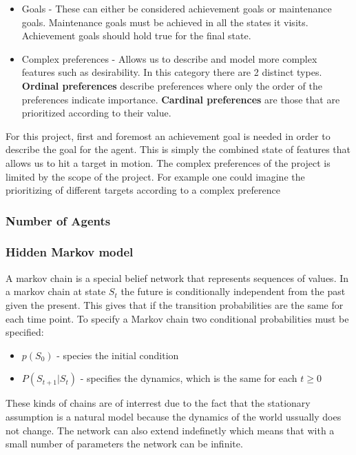 \begin{itemize}
  \item Goals - These can either be considered achievement goals or
  maintenance goals. Maintenance goals must be achieved in all the states
  it visits. Achievement goals should hold true for the final state.
  \item Complex preferences - Allows us to describe and model more complex
  features such as desirability. In this category there are 2 distinct types.
  \textbf{Ordinal preferences} describe preferences where only the order of the
  preferences indicate importance. \textbf{Cardinal preferences} are those that
  are prioritized according to their value.
\end{itemize}

For this project, first and foremost an achievement goal is needed in order to
describe the goal for the agent. This is simply the combined state of features
that allows us to hit a target in motion. The complex preferences of the
project is limited by the scope of the project. For example one could imagine
the prioritizing of different targets according to a complex preference

\subsubsection{Number of Agents}

\subsubsection{Hidden Markov model}
A markov chain is a special belief network that represents sequences of values.
In a markov chain at state $S_t$ the future is conditionally independent from
the past given the present. This gives that if the transition probabilities are
the same for each time point. To specify a Markov chain two conditional
probabilities must be specified:
\begin{itemize}
  \item $p(S_0)$ - species the initial condition
  \item $P(S_{t+1}|S_t)$ - specifies the dynamics, which is the same for each $t
  \geq 0$
\end{itemize}

These kinds of chains are of interrest due to the fact that the stationary
assumption is a natural model because the dynamics of the world ussually does
not change. The network can also extend indefinetly which means that with a
small number of parameters the network can be infinite.\nl


